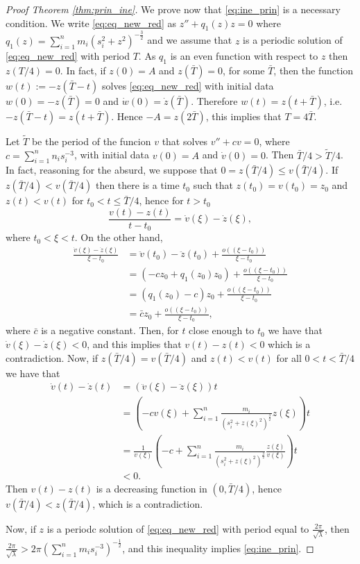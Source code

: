 \documentclass[twoside]{article}
\theoremstyle{remark}
\begin{document}
\begin{proof}[Proof Theorem \ref{thm:prin_ine}]
We prove now that \eqref{eq:ine_prin} is a necessary condition. We write \eqref{eq:eq_new_red}
as $z''+q_1(z)z=0$ where $q_1(z)=\sum_{i=1}^{n} m_i \left(s_i^2 +z^2\right)^{-\frac32}$ and we assume that $z$ is a periodic solution of \eqref{eq:eq_new_red} with period $T$. As $q_1$ is an even function with respect to $z$ then $z(T/4)=0$. In fact, if $z(0)=A$ and $z(\bar{T})=0$, for some $\bar{T}$, then the function $w(t):=-z(\bar{T}-t)$ solves \eqref{eq:eq_new_red} with initial data $w(0)=-z(\bar{T})=0$ and $\dot{w}(0)=\dot{z}(\bar{T})$. Therefore $w(t)=z(t+\bar{T})$, i.e. $-z(\bar{T}-t)=z(t+\bar{T})$. Hence $-A=z(2\bar{T})$, this implies that $T=4\bar{T}$. 

Let $\widetilde{T}$ be the period of the funcion $v$  that solves $v''+cv=0$,  where $c=\sum_{i=1}^{n}n_is_i^{-3}$, with initial data $v(0)=A$ and $\dot{v}(0)=0$. Then  $\bar{T}/4>\widetilde{T}/4$. In fact, 
 reasoning for the absurd, we suppose that $0=z(\bar{T}/4)\leq v(\bar{T}/4)$. If $z(\bar{T}/4)< v(\bar{T}/4)$ then there is a time $t_0$ such that $z(t_0)=v(t_0)=z_0$ and $z(t)<v(t)$ for $t_0<t\leq\bar{T}/4$, hence for $t>t_0$
\[\frac{v(t)-z(t)}{t-t_0}=\dot{v}(\xi)-\dot{z}(\xi),\]
where $t_0<\xi<t$. On the other hand, 
\begin{equation*}
\begin{split}
\frac{\dot{v}(\xi)-\dot{z}(\xi)}{\xi-t_0}&=\ddot{v}(t_0)-\ddot{z}(t_0)+\frac{o((\xi-t_0))}{\xi-t_0}\\
&=(-cz_0+q_1(z_0)z_0)+\frac{o((\xi-t_0))}{\xi-t_0}\\
&=(q_{1}(z_0)-c)z_0+\frac{o((\xi-t_0))}{\xi-t_0}\\
&=\bar{c}z_0+\frac{o((\xi-t_0))}{\xi-t_0},
\end{split}
\end{equation*}
where $\bar{c}$ is a negative constant. Then, for  $t$ close enough
 to $t_0$ we have that $\dot{v}(\xi)-\dot{z}(\xi)<0$, and this implies that $v(t)-z(t)<0$ which is a contradiction.
 Now, if $z(\bar{T}/4)= v(\bar{T}/4)$ and $z(t)<v(t)$ for all $0<t<\bar{T}/4$ we have that
\begin{equation*}
\begin{split}
\dot{v}(t)-\dot{z}(t)&=(\ddot{v}(\xi)-\ddot{z}(\xi))t\\
&=\left(-cv(\xi)+\sum_{i=1}^{n}\frac{m_i}{(s_i^2+z(\xi)^2)^{\frac32}}z(\xi)\right)t\\
&=\frac{1}{v(\xi)} \left(-c+\sum_{i=1}^{n}\frac{m_i}{(s_i^2+z(\xi)^2)^{\frac32}}\frac{z(\xi)}{v(\xi)}\right) t\\
&<0.
\end{split}
\end{equation*}
Then $v(t)-z(t)$ is a decreasing function in $(0,\bar{T}/4)$, hence $v(\bar{T}/4)<z(\bar{T}/4)$, which is a contradiction.

Now, if $z$ is a periodc solution of \eqref{eq:eq_new_red} with period equal to $\frac{2\pi}{\sqrt{\lambda}}$, then $\frac{2\pi}{\sqrt{\lambda}}>2\pi \left(\sum_{i=1}^n m_is_i^{-3}\right)^{-\frac12}$, and this inequality implies \eqref {eq:ine_prin}.
\end{proof}
\end{document}
